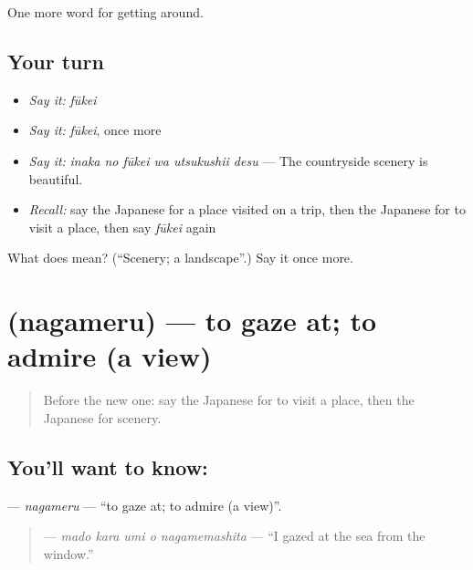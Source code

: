 \begin{grammarlens}[title={What you've built}]
One more word for getting around.
\end{grammarlens}

\subsection*{Your turn}
\begin{itemize}
\raggedright
  \item \emph{Say it:} \emph{fūkei}
  \item \emph{Say it:} \emph{fūkei}, once more
  \item \emph{Say it:} \emph{inaka no fūkei wa utsukushii desu} — The countryside scenery is beautiful.
  \item \emph{Recall:} say the Japanese for a place visited on a trip, then the Japanese for to visit a place, then say \emph{fūkei} again
\end{itemize}

\begin{tcolorbox}[breakable,colback=teal!4,colframe=teal!35!black,title={Before you move on}]
What does  mean? (\textquotedblleft{}Scenery; a landscape\textquotedblright{}.) Say it once more.
\end{tcolorbox}
\section[\texorpdfstring{\ja{ながめる} (nagameru)}{ながめる (nagameru)}]{ (nagameru) — to gaze at; to admire (a view)}

\label{lesson:JA-C404-nagameru}



\begin{quote}
Before the new one: say the Japanese for to visit a place, then the Japanese for scenery.
\end{quote}

\subsection*{You'll want to know: }
\textbf{} — \emph{nagameru} — \textquotedblleft{}to gaze at; to admire (a view)\textquotedblright{}.

\begin{quote}
\textbf{  } — \emph{mado kara umi o nagamemashita} — \textquotedblleft{}I gazed at the sea from the window.\textquotedblright{}
\end{quote}


